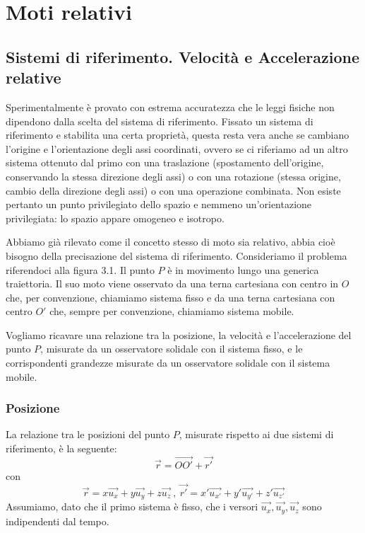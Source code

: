 \documentclass[class=book, crop=false, oneside, 12pt]{standalone}
\begin{document}
\chapter{Moti relativi}

\section{Sistemi di riferimento. Velocità e Accelerazione relative}

Sperimentalmente è provato con estrema accuratezza che le leggi fisiche non dipendono dalla scelta del sistema di riferimento. 
Fissato un sistema di riferimento e stabilita una certa proprietà, questa resta vera anche se cambiano l'origine e l'orientazione degli assi coordinati, ovvero se ci riferiamo ad un altro sistema ottenuto dal primo con una traslazione (spostamento dell'origine, conservando la stessa direzione degli assi) o con una rotazione (stessa origine, cambio della direzione degli assi) o con una operazione combinata.
Non esiste pertanto un punto privilegiato dello spazio e nemmeno un'orientazione privilegiata: lo spazio appare omogeneo e isotropo. 

Abbiamo già rilevato come il concetto stesso di moto sia relativo,  abbia cioè bisogno della precisazione del sistema di riferimento. 
Consideriamo il problema riferendoci alla figura 3.1. 
Il punto \(P\) è in movimento lungo una generica traiettoria. 
Il suo moto viene osservato da una terna cartesiana con centro in \(O\) che, per convenzione, chiamiamo sistema fisso e da una terna cartesiana con centro \(O'\) che, sempre per convenzione, chiamiamo sistema mobile.

Vogliamo ricavare una relazione tra la posizione, la velocità e l'accelerazione del punto \(P\), misurate da un osservatore solidale con il sistema fisso, e le corrispondenti grandezze misurate da un osservatore solidale con il sistema mobile. 

\subsection{Posizione}

La relazione tra le posizioni del punto \(P\), misurate rispetto ai due sistemi di riferimento, è la seguente:
\begin{equation}
    \overrightarrow{r} = \overrightarrow{OO'} + \overrightarrow{r'}
\end{equation}
con 
\begin{equation*}
    \overrightarrow{r} = x \overrightarrow{u_x} + y \overrightarrow{u_y} + z \overrightarrow{u_z} \ , \ \overrightarrow{r'} = x' \overrightarrow{u_{x'}} + y' \overrightarrow{u_{y'}} + z' \overrightarrow{u_{z'}} 
\end{equation*}
Assumiamo, dato che il primo sistema è fisso, che i versori \(\overrightarrow{u_x}, \overrightarrow{u_y}, \overrightarrow{u_z}\) sono indipendenti dal tempo.
\end{document}
